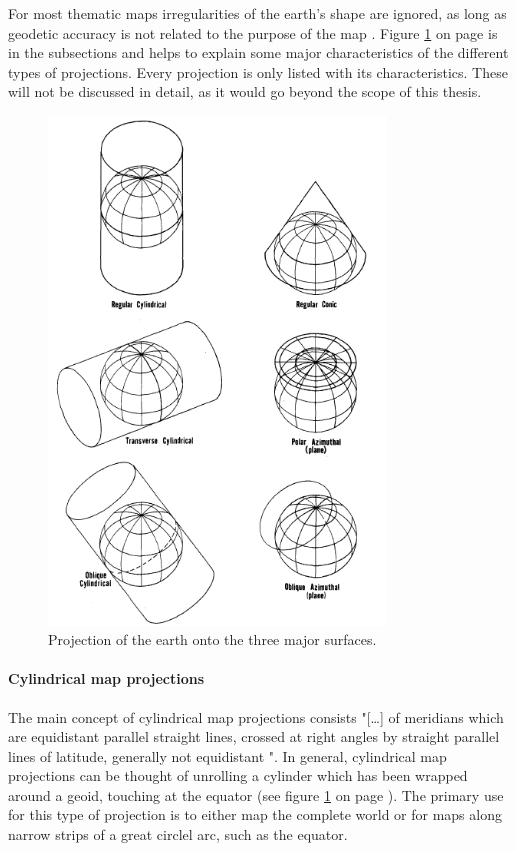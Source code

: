 For most thematic maps irregularities of the earth's shape are ignored, as long as geodetic accuracy is not related to the purpose of the map . Figure \ref{fig:projections-base} on page \pageref{fig:projections-base} is in the subsections and helps to explain some major characteristics of the different types of projections. Every projection is only listed with its characteristics. These will not be discussed in detail, as it would go beyond the scope of this thesis.

\begin{figure}[!htb]
\centering
\includegraphics[width=0.8\textwidth,keepaspectratio]{images/methods/mappings.png}
\caption[
    Projection of the earth onto the three major surfaces .
]{Projection of the earth onto the three major surfaces.}
\label{fig:projections-base}
\end{figure}

\paragraph{Cylindrical map projections}
The main concept of cylindrical map projections consists "[\ldots] of meridians which are equidistant parallel straight lines, crossed at right angles by straight parallel lines of latitude, generally not equidistant ".
In general, cylindrical map projections can be thought of unrolling a cylinder which has been wrapped around a geoid, touching at the equator (see figure \ref{fig:projections-base} on page \pageref{fig:projections-base}).
The primary use for this type of projection is to either map the complete world or for maps along narrow strips of a great circlel arc, such as the equator.


